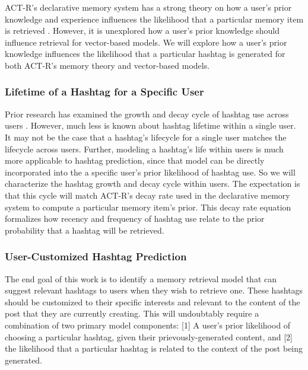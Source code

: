 \documentclass[man,floatsintext]{apa6}
\begin{document}
ACT-R's declarative memory system has a strong theory on how a user's prior knowledge and experience influences the likelihood that a particular memory item is retrieved \parencite{Anderson2004}.
However, it is unexplored how a user's prior knowledge should influence retrieval for vector-based models.
We will explore how a user's prior knowledge influences the likelihood that a particular hashtag is generated for both ACT-R's memory theory and vector-based models.

\subsubsection{Lifetime of a Hashtag for a Specific User}

Prior research has examined the growth and decay cycle of hashtag use across users \parencite{Tsur2012}.
However, much less is known about hashtag lifetime within a single user.
It may not be the case that a hashtag's lifecycle for a single user matches the lifecycle across users.
Further, modeling a hashtag's life within users is much more applicable to hashtag prediction, since that model can be directly incorporated into the a specific user's prior likelihood of hashtag use.
So we will characterize the hashtag growth and decay cycle within users.
The expectation is that this cycle will match ACT-R's decay rate used in the declarative memory system to compute a particular memory item's prior.
This decay rate equation formalizes how recency and frequency of hashtag use relate to the prior probability that a hashtag will be retrieved.

\subsubsection{User-Customized Hashtag Prediction}

The end goal of this work is to identify a memory retrieval model that can suggest relevant hashtags to users when they wish to retrieve one.
These hashtags should be customized to their specific interests and relevant to the content of the post that they are currently creating.
This will undoubtably require a combination of two primary model components:
[1] A user's prior likelihood of choosing a particular hashtag, given their prievously-generated content, and [2] the likelihood that a particular hashtag is related to the context of the post being generated. 
\end{document}
